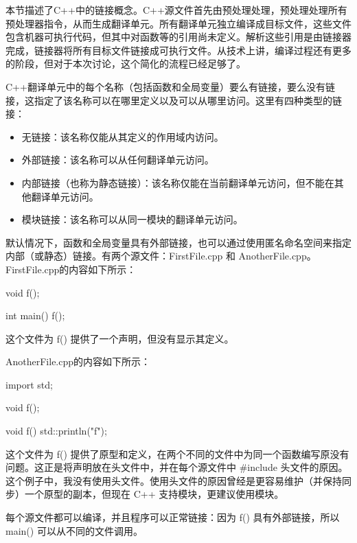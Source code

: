 
本节描述了C++中的链接概念。C++源文件首先由预处理处理，预处理处理所有预处理器指令，从而生成翻译单元。所有翻译单元独立编译成目标文件，这些文件包含机器可执行代码，但其中对函数等的引用尚未定义。解析这些引用是由链接器完成，链接器将所有目标文件链接成可执行文件。从技术上讲，编译过程还有更多的阶段，但对于本次讨论，这个简化的流程已经足够了。

C++翻译单元中的每个名称（包括函数和全局变量）要么有链接，要么没有链接，这指定了该名称可以在哪里定义以及可以从哪里访问。这里有四种类型的链接：

\begin{itemize}
\item
无链接：该名称仅能从其定义的作用域内访问。

\item
外部链接：该名称可以从任何翻译单元访问。

\item
内部链接（也称为静态链接）：该名称仅能在当前翻译单元访问，但不能在其他翻译单元访问。

\item
模块链接：该名称可以从同一模块的翻译单元访问。
\end{itemize}


默认情况下，函数和全局变量具有外部链接，也可以通过使用匿名命名空间来指定内部（或静态）链接。有两个源文件：FirstFile.cpp 和 AnotherFile.cpp。FirstFile.cpp的内容如下所示：

\begin{cpp}
void f();

int main()
{
    f();
}
\end{cpp}

这个文件为 f() 提供了一个声明，但没有显示其定义。

AnotherFile.cpp的内容如下所示：

\begin{cpp}
import std;

void f();

void f()
{
    std::println("f");
}
\end{cpp}

这个文件为 f() 提供了原型和定义，在两个不同的文件中为同一个函数编写原没有问题。这正是将声明放在头文件中，并在每个源文件中 \#include 头文件的原因。这个例子中，我没有使用头文件。使用头文件的原因曾经是更容易维护（并保持同步）一个原型的副本，但现在 C++ 支持模块，更建议使用模块。

每个源文件都可以编译，并且程序可以正常链接：因为 f() 具有外部链接，所以 main() 可以从不同的文件调用。

